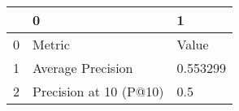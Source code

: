 \begin{tabular}{lll}
\toprule
{} &                       0 &         1 \\
\midrule
0 &                  Metric &     Value \\
1 &       Average Precision &  0.553299 \\
2 &  Precision at 10 (P@10) &       0.5 \\
\bottomrule
\end{tabular}
